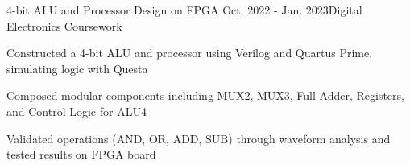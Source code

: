 \begin{rSubsection}{4-bit ALU and Processor Design on FPGA} {Oct. 2022 - Jan. 2023}{Digital Electronics Coursework}{}
\item Constructed a 4-bit ALU and processor using Verilog and Quartus Prime, simulating logic with Questa
\item Composed modular components including MUX2, MUX3, Full Adder, Registers, and Control Logic for ALU4
\item Validated operations (AND, OR, ADD, SUB) through waveform analysis and tested results on FPGA board
\end{rSubsection}
